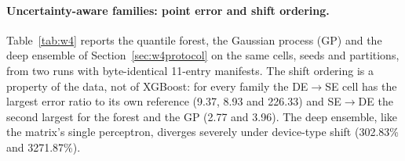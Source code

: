 \documentclass[11pt,a4paper]{article}
\begin{document}
\begin{table}[t]
\centering\small
\caption{Post-hoc metric robustness of the method matrix (XGBoost; means over
repeats; not part of the frozen protocol). Median APE (MdAPE) and symmetric
MAPE (sMAPE, $100\cdot\mathrm{mean}\,|\hat d-d|/((|\hat d|+|d|)/2)$) in percent; log-ratio error is the mean absolute $\log(\hat d/d)$. Ratios are to
the same dataset's random-split reference cell under the same metric.}
\label{tab:w3robust}
\end{table}

\paragraph{Uncertainty-aware families: point error and shift ordering.}
Table~\ref{tab:w4} reports the quantile forest, the Gaussian process (GP) and the
deep ensemble of Section~\ref{sec:w4protocol} on the same cells, seeds and
partitions, from two runs with byte-identical 11-entry manifests. The shift
ordering is a property of the data, not of XGBoost: for every family the
DE$\to$SE cell has the largest error ratio to its own reference (9.37, 8.93
and 226.33) and SE$\to$DE the second largest for the forest and the GP
(2.77 and 3.96). The deep ensemble, like the matrix's single perceptron,
diverges severely under device-type shift (302.83\% and 3271.87\%).
\end{document}
